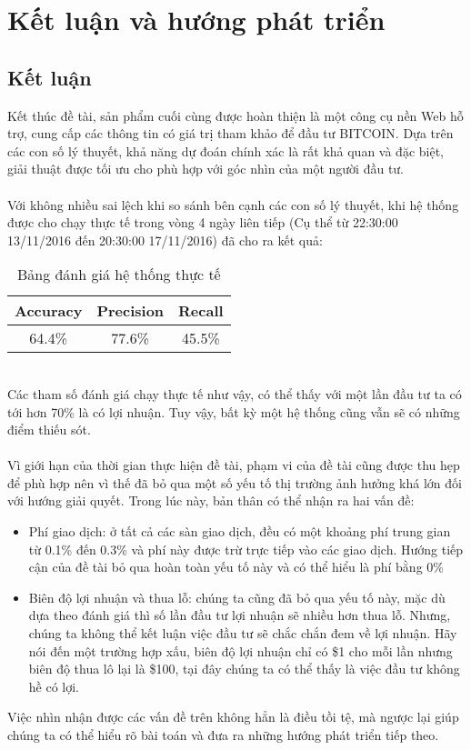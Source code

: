 \chapter{Kết luận và hướng phát triển}

\section{Kết luận}
Kết thúc đề tài, sản phẩm cuối cùng được hoàn thiện là một công cụ nền Web hỗ 
trợ, cung cấp các thông tin có giá trị tham khảo để đầu tư BITCOIN. Dựa trên 
các con số lý thuyết, khả năng dự đoán chính xác là rất khả quan và đặc biệt, 
giải thuật được tối ưu cho phù hợp với góc nhìn của một người đầu tư.\\\\
Với không nhiều sai lệch khi so sánh bên cạnh các con số lý thuyết, khi hệ thống được cho chạy 
thực tế trong vòng 4 ngày liên tiếp (Cụ thể từ 22:30:00 13/11/2016 đến 
20:30:00 17/11/2016) đã cho ra kết quả:\\
\begin{table}[h]
\centering
\begin{tabular}{ |c|c|c| }
\hline
Accuracy & Precision & Recall \\
\hline
64.4\% & 77.6\% & 45.5\% \\
\hline
\end{tabular}
\caption{Bảng đánh giá hệ thống thực tế }
\end{table}\\
Các tham số đánh giá chạy thực tế như vậy, có thể thấy với một lần đầu tư 
ta có tới hơn 70\% là có lợi nhuận. Tuy vậy, bất kỳ một hệ thống cũng vẫn 
sẽ có những điểm thiếu sót.\\\\
Vì giới hạn của thời gian thực hiện đề tài, phạm vi của đề tài cũng được thu 
hẹp để phù hợp nên vì thế đã bỏ qua một số yếu tố thị trường ảnh hưởng khá lớn 
đối với hướng giải quyết. Trong lúc này, bản thân có thể nhận ra hai vấn đề:
\begin{itemize}
\item Phí giao dịch: ở tất cả các sàn giao dịch, đều có một khoảng phí trung gian 
từ 0.1\% đến 0.3\% và phí này được trừ trực tiếp vào các giao dịch. Hướng tiếp 
cận của đề tài bỏ qua hoàn toàn yếu tố này và có thể hiểu là phí bằng 0\%
\item Biên độ lợi nhuận và thua lỗ: chúng ta cũng đã bỏ qua yếu tố này, mặc dù 
dựa theo đánh giá thì số lần đầu tư lợi nhuận sẽ nhiều hơn thua lỗ. Nhưng, chúng 
ta không thể kết luận việc đầu tư sẽ chắc chắn đem về lợi nhuận. Hãy nói đến một 
trường hợp xấu, biên độ lợi nhuận chỉ có \$1 cho mỗi lần nhưng biên độ thua lô 
lại là \$100, tại đây chúng ta có thể thấy là việc đầu tư không hề có lợi.
\end{itemize}
Việc nhìn nhận được các vấn đề trên không hẳn là điều tồi tệ, mà ngược lại giúp 
chúng ta có thể hiểu rõ bài toán và đưa ra những hướng phát triển tiếp theo.

